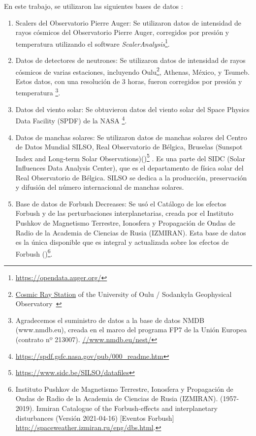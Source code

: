 En este trabajo, se utilizaron las siguientes bases de datos :
\begin{enumerate}

\item Scalers del Observatorio Pierre Auger: Se utilizaron datos de intensidad de rayos cósmicos del Observatorio Pierre Auger, corregidos por presión y temperatura utilizando el software \textit{ScalerAnalysis}\footnote{\url{https://opendata.auger.org/}}.
    \item Datos de detectores de neutrones: Se utilizaron datos de intensidad de rayos cósmicos de varias estaciones, incluyendo Oulu\footnote{\href{https://cosmicrays.oulu.fi/}{Cosmic Ray Station}  of the University of Oulu / Sodankyla Geophysical Observatory 
}, Athenas, México, y Tsumeb. Estos datos, con una resolución de 3 horas, fueron corregidos por presión y temperatura \footnote{Agradecemos el suministro de datos a la base de datos NMDB (www.nmdb.eu), creada en el marco del programa FP7 de la Unión Europea (contrato nº 213007).  \url{//www.nmdb.eu/nest/}}.
    \item Datos del viento solar: Se obtuvieron datos del viento solar del Space Physics Data Facility (SPDF) de la NASA \footnote{\url{https://spdf.gsfc.nasa.gov/pub/000_readme.htm}}.
    \item Datos de manchas solares: Se utilizaron datos de manchas solares del Centro de Datos Mundial SILSO, Real Observatorio de Bélgica, Bruselas (Sunspot Index and Long-term Solar Observations)(\cite{sidc})\footnote{\url{https://www.sidc.be/SILSO/datafiles}} . Es una parte del SIDC (Solar Influences Data Analysis Center), que es el departamento de física solar del Real Observatorio de Bélgica. SILSO se dedica a la producción, preservación y difusión del número internacional de manchas solares.
    \item Base de datos de Forbush Decreases: Se usó el Catálogo de los efectos Forbush y de las perturbaciones interplanetarias, creada por el Instituto Pushkov de Magnetismo Terrestre, Ionosfera y Propagación de Ondas de Radio de la Academia de Ciencias de Rusia (IZMIRAN). Esta base de datos es la única disponible que es integral y actualizada sobre los efectos de Forbush (\cite{okike_2021})\footnote{Instituto Pushkov de Magnetismo Terrestre, Ionosfera y Propagación de Ondas de Radio de la Academia de Ciencias de Rusia (IZMIRAN). (1957-2019). Izmiran Catalogue of the Forbush-effects and interplanetary disturbances (Versión 2021-04-16) [Eventos Forbush] \url{http://spaceweather.izmiran.ru/eng/dbs.html}.}.
\end{enumerate}

